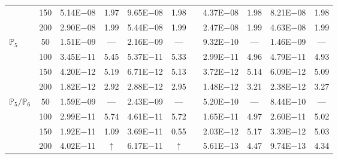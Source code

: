 \begin{table}[H]
{\begin{tabular}{@{}l c c c c c c c c c c@{}}
 & 150 & 5.14E$-$08 & 1.97  & 9.65E$-$08 & 1.98 &  & 4.37E$-$08 & 1.98 & 8.21E$-$08 & 1.98\\
 & 200 & 2.90E$-$08 & 1.99  & 5.44E$-$08 & 1.99 &  & 2.47E$-$08 & 1.99 & 4.63E$-$08 & 1.99\\
\midrule
\multirow{4}{*}{$\mathbb{P}_{5}$}
 & 50 & 1.51E$-$09 & ---  & 2.16E$-$09 & --- &  & 9.32E$-$10 & --- & 1.46E$-$09 & ---\\
 & 100 & 3.45E$-$11 & 5.45  & 5.37E$-$11 & 5.33 &  & 2.99E$-$11 & 4.96 & 4.79E$-$11 & 4.93\\
 & 150 & 4.20E$-$12 & 5.19  & 6.71E$-$12 & 5.13 &  & 3.72E$-$12 & 5.14 & 6.09E$-$12 & 5.09\\
 & 200 & 1.82E$-$12 & 2.92  & 2.88E$-$12 & 2.95 &  & 1.48E$-$12 & 3.21 & 2.38E$-$12 & 3.27\\
\midrule
\multirow{4}{*}{$\mathbb{P}_{5}/\mathbb{P}_{6}$}
 & 50 & 1.59E$-$09 & ---  & 2.43E$-$09 & --- &  & 5.20E$-$10 & --- & 8.44E$-$10 & ---\\
 & 100 & 2.99E$-$11 & 5.74  & 4.61E$-$11 & 5.72 &  & 1.65E$-$11 & 4.97 & 2.60E$-$11 & 5.02\\
 & 150 & 1.92E$-$11 & 1.09  & 3.69E$-$11 & 0.55 &  & 2.03E$-$12 & 5.17 & 3.39E$-$12 & 5.03\\
 & 200 & 4.02E$-$11 & $\uparrow$  & 6.17E$-$11 & $\uparrow$ &  & 5.61E$-$13 & 4.47 & 9.74E$-$13 & 4.34\\
\bottomrule
\end{tabular}}
\label{none}
\end{table}
